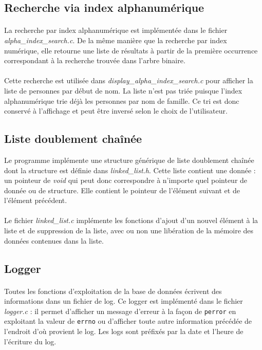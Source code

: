 \documentclass{article}
\begin{document}
    \subsection{Recherche via index alphanumérique}
    \paragraph{}
    La recherche par index alphanumérique est implémentée dans le fichier \emph{alpha\_index\_search.c}. De la même manière que la recherche par index numérique, elle retourne une liste de résultats à partir de la première occurrence correspondant à la recherche trouvée dans l'arbre binaire.

    \paragraph{}
    Cette recherche est utilisée dans \emph{display\_alpha\_index\_search.c} pour afficher la liste de personnes par début de nom. La liste n'est pas triée puisque l'index alphanumérique trie déjà les personnes par nom de famille. Ce tri est donc conservé à l'affichage et peut être inversé selon le choix de l'utilisateur.
    

    \subsection{Liste doublement chaînée}
    Le programme implémente une structure générique de liste doublement chaînée dont la structure est définie dans \emph{linked\_list.h}. Cette liste contient une donnée : un pointeur de \emph{void} qui peut donc correspondre à n'importe quel pointeur de donnée ou de structure. Elle contient le pointeur de l'élément suivant et de l'élément précédent.

    \paragraph{}
    Le fichier \emph{linked\_list.c} implémente les fonctions d'ajout d'un nouvel élément à la liste et de suppression de la liste, avec ou non une libération de la mémoire des données contenues dans la liste.


    \subsection{Logger}
    \paragraph{}
    Toutes les fonctions d'exploitation de la base de données écrivent des informations dans un fichier de log. Ce logger est implémenté dans le fichier \emph{logger.c} : il permet d'afficher un message d'erreur à la façon de \texttt{perror} en exploitant la valeur de \texttt{errno} ou d'afficher toute autre information précédée de l'endroit d'où provient le log. Les logs sont préfixés par la date et l'heure de l'écriture du log.
\end{document}
